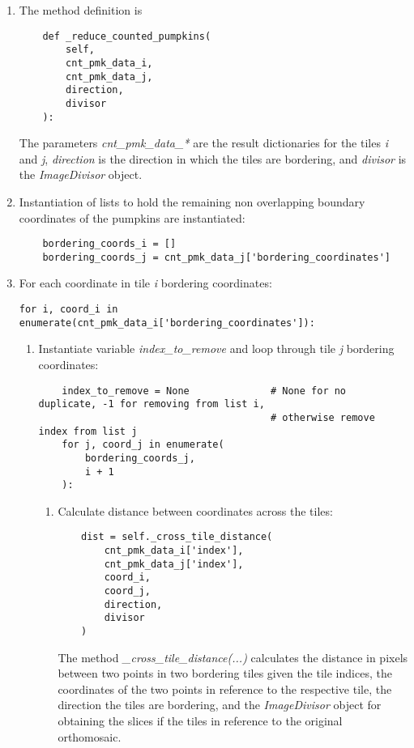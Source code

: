 \documentclass[../Head/Main.tex]{subfiles}
\begin{document}
\begin{enumerate}
\item The method definition is
\begin{verbatim}
    def _reduce_counted_pumpkins(
        self,
        cnt_pmk_data_i,
        cnt_pmk_data_j,
        direction,
        divisor
    ):
\end{verbatim}
The parameters \textit{cnt\_pmk\_data\_*} are the result dictionaries for the tiles \textit{i} and \textit{j}, \textit{direction} is the direction in which the tiles are bordering, and \textit{divisor} is the \textit{ImageDivisor} object.
\item Instantiation of lists to hold the remaining non overlapping boundary coordinates of the pumpkins are instantiated:
\begin{verbatim}
    bordering_coords_i = []
    bordering_coords_j = cnt_pmk_data_j['bordering_coordinates']
\end{verbatim}
\item For each coordinate in tile \textit{i} bordering coordinates:
\begin{verbatim}
for i, coord_i in enumerate(cnt_pmk_data_i['bordering_coordinates']):
\end{verbatim}
\begin{enumerate}
\item Instantiate variable \textit{index\_to\_remove} and loop through tile \textit{j} bordering coordinates:
\begin{verbatim}
    index_to_remove = None              # None for no duplicate, -1 for removing from list i, 
                                        # otherwise remove index from list j
    for j, coord_j in enumerate(
        bordering_coords_j,
        i + 1
    ):
\end{verbatim}
\begin{enumerate}
\item Calculate distance between coordinates across the tiles:
\begin{verbatim}
    dist = self._cross_tile_distance(
        cnt_pmk_data_i['index'],
        cnt_pmk_data_j['index'],
        coord_i,
        coord_j,
        direction,
        divisor
    )
\end{verbatim}
The method \textit{\_cross\_tile\_distance(...)} calculates the distance in pixels between two points in two bordering tiles given the tile indices, the coordinates of the two points in reference to the respective tile, the direction the tiles are bordering, and the \textit{ImageDivisor} object for obtaining the slices if the tiles in reference to the original orthomosaic.

\end{enumerate}
\end{enumerate}
\end{enumerate}
\end{document}
